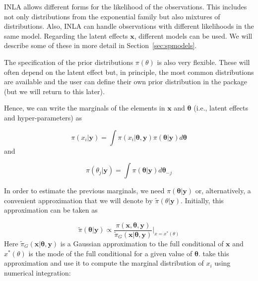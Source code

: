 \documentclass[article]{jss}
\begin{document}
INLA allows different forms for the likelihood of the observations.  This
includes not only distributions from the exponential family but also mixtures
of distributions. Also, INLA can handle observations with different likelihoods
in the same model. Regarding the latent effects $\mathbf{x}$, different models
can be used. We will describe some of these in more detail in
Section~\ref{sec:spmodels}.


The specification of the prior distributions $\pi(\theta)$ is also very 
flexible. These will often depend on the latent effect but, in principle,
the most common distributions are available and the user can define their
own prior distribution in the  package (but we will return
to this later). 

Hence, we can write the marginals of the elements in $\mathbf{x}$
and $\mathbf{\theta}$ (i.e., latent effects and hyper-parameters) as

\begin{equation}
\pi(x_i|\mathbf{y}) = \int \pi(x_i|\mathbf{\theta}, \mathbf{y})  \pi(\mathbf{\theta}| \mathbf{y}) d\mathbf{\theta}
\end{equation}
\noindent
and

\begin{equation}
\pi(\theta_j|\mathbf{y}) = \int \pi(\mathbf{\theta}| \mathbf{y})  d\mathbf{\theta}_{-j} 
\end{equation}

In order to estimate the previous marginals, we need 
$\pi(\mathbf{\theta}|\mathbf{y})$ or, alternatively, a convenient
approximation that we will denote by $\tilde\pi(\theta|\mathbf{y})$.
Initially, this approximation can be taken as

\begin{equation}
\tilde\pi(\mathbf{\theta}|\mathbf{y})\propto 
\frac{\pi(\mathbf{x},\mathbf{\theta},\mathbf{y})}{\tilde\pi_G(\mathbf{x}|\mathbf{\theta},\mathbf{y})}\bigg|_{x=x^*(\theta)}
\end{equation}
\noindent
Here 
$\tilde\pi_G(\mathbf{x}|\mathbf{\theta},\mathbf{y})$ is a Gaussian
approximation to the full conditional of $\mathbf{x}$ and $x^*(\theta)$
is the mode of the full conditional for a given value of $\mathbf{\theta}$.
\citet{isi:000264374200002} take this approximation and use it 
to compute the marginal distribution of $x_i$ using numerical integration:
\end{document}
